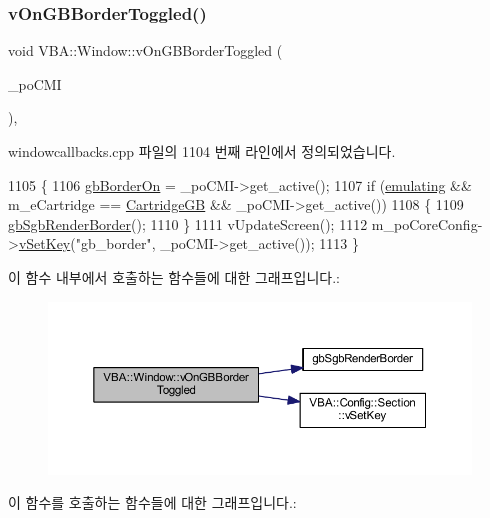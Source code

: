 \subsubsection{\texorpdfstring{v\+On\+G\+B\+Border\+Toggled()}{vOnGBBorderToggled()}}
{\footnotesize\ttfamily void V\+B\+A\+::\+Window\+::v\+On\+G\+B\+Border\+Toggled (\begin{DoxyParamCaption}\item[{Gtk\+::\+Check\+Menu\+Item $\ast$}]{\+\_\+po\+C\+MI }\end{DoxyParamCaption})\hspace{0.3cm}{\ttfamily [protected]}, {\ttfamily [virtual]}}



windowcallbacks.\+cpp 파일의 1104 번째 라인에서 정의되었습니다.


\begin{DoxyCode}
1105 \{
1106   \mbox{\hyperlink{gb_globals_8cpp_a4700c36a68a6b63f7c2e91756a250cd2}{gbBorderOn}} = \_poCMI->get\_active();
1107   \textcolor{keywordflow}{if} (\mbox{\hyperlink{gb_globals_8h_af9cc36078b1b311753963297ae7f2a74}{emulating}} && m\_eCartridge == \mbox{\hyperlink{class_v_b_a_1_1_window_af580451d3ee7a738a73434858a08fa65a23a8d7e61dfcb4c1935477f7b9b80067}{CartridgeGB}} && \_poCMI->get\_active())
1108   \{
1109     \mbox{\hyperlink{_g_b_8h_af317983dce6743159185981f1f84e782}{gbSgbRenderBorder}}();
1110   \}
1111   vUpdateScreen();
1112   m\_poCoreConfig->\mbox{\hyperlink{class_v_b_a_1_1_config_1_1_section_a57e1b95cbea40db71c093381beff4b0e}{vSetKey}}(\textcolor{stringliteral}{"gb\_border"}, \_poCMI->get\_active());
1113 \}
\end{DoxyCode}
이 함수 내부에서 호출하는 함수들에 대한 그래프입니다.\+:
\nopagebreak
\begin{figure}[H]
\begin{center}
\leavevmode
\includegraphics[width=350pt]{class_v_b_a_1_1_window_aa7cf1b717713eb050de751b12ddfe72a_cgraph}
\end{center}
\end{figure}
이 함수를 호출하는 함수들에 대한 그래프입니다.\+:
